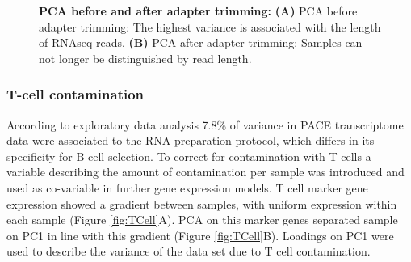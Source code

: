 \begin{figure}
\begin{subfigure}[t]{0.6\columnwidth}
		\subcaption*{}
		\label{fig:PCA_readlength_trimmed}
	\end{subfigure}
	\caption{\textbf{PCA before and after adapter trimming:} \textbf{(A)} PCA before adapter trimming: The highest variance is associated with the length of RNAseq reads. \textbf{(B)} PCA after adapter trimming: Samples can not longer be distinguished by read length.}
	\label{fig:Trimming}
\end{figure}



\FloatBarrier

\subsubsection{T-cell contamination}
According to exploratory data analysis 7.8\% of variance in PACE transcriptome data were associated to the RNA preparation protocol, which differs in its specificity for B cell selection. To correct for contamination with T cells a variable describing the amount of contamination per sample was introduced and used as co-variable in further gene expression models. T cell marker gene expression showed a gradient between samples, with uniform expression within each sample (Figure \ref{fig:TCell}A). PCA on this marker genes separated sample on PC1 in line with this gradient (Figure \ref{fig:TCell}B). Loadings on PC1 were used to describe the variance of the data set due to T cell contamination.   

\FloatBarrier

